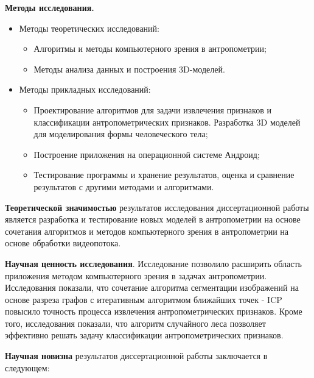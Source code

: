 \textbf{Методы исследования.}
\begin{itemize}
	\item Методы  теоретических исследований:

	\begin{itemize}
		\item Алгоритмы и методы компьютерного зрения в антропометрии;
		\item Методы анализа данных и построения 3D-моделей.
	\end{itemize}

\end{itemize}
\begin{itemize}
	\item Методы прикладных исследований:

	\begin{itemize}
		\item Проектирование алгоритмов для задачи извлечения признаков и классификации антропометрических признаков. Разработка 3D моделей для моделирования формы человеческого тела;
		\item Построение приложения на операционной системе Андроид;
		\item Тестирование программы и хранение результатов, оценка и сравнение результатов с другими методами и алгоритмами.
	\end{itemize}

\end{itemize}

\textbf{Теоретической значимостью} результатов исследования диссертационной работы является разработка и тестирование новых моделей в антропометрии на основе сочетания алгоритмов и методов компьютерного зрения в антропометрии на основе обработки видеопотока.

\textbf{Научная ценность исследования}. Исследование позволило расширить область приложения методом компьютерного зрения в задачах антропометрии. Исследования показали, что сочетание алгоритма сегментации изображений на основе разреза графов с  итеративным алгоритмом ближайших точек -  ICP повысило точность процесса извлечения антропометрических признаков. Кроме того, исследования показали, что алгоритм случайного леса позволяет эффективно решать задачу классификации антропометрических признаков.

\textbf{Научная новизна} результатов диссертационной работы заключается в следующем:

